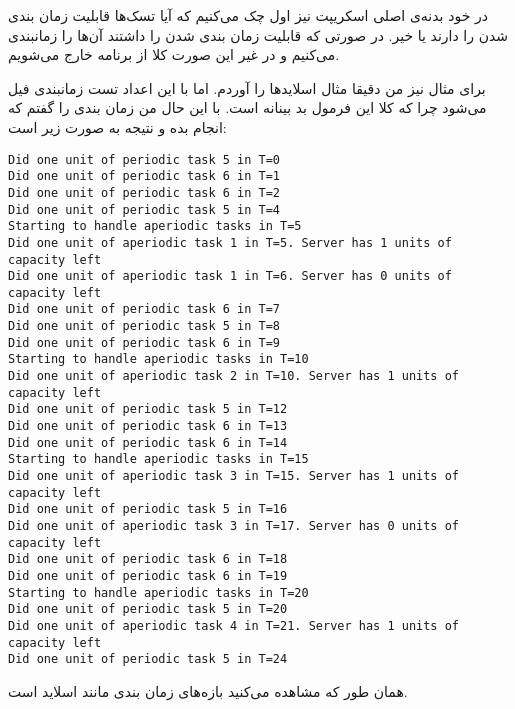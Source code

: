 \documentclass[]{article}
\begin{document}
در خود بدنه‌ی اصلی اسکریپت نیز اول چک می‌کنیم که آیا تسک‌ها قابلیت زمان بندی شدن را دارند یا خیر.
در صورتی که قابلیت زمان بندی شدن را داشتند آن‌ها را زمانبندی می‌کنیم و در غیر این صورت کلا از برنامه
خارج می‌شویم.

برای مثال نیز من دقیقا مثال اسلاید‌ها را آوردم. اما با این اعداد تست زمانبندی فیل می‌شود چرا
که کلا این فرمول بد بینانه است. با این حال من زمان بندی را گفتم که انجام بده و نتیجه به صورت
زیر است:
\begin{latin}
\begin{lstlisting}
Did one unit of periodic task 5 in T=0
Did one unit of periodic task 6 in T=1
Did one unit of periodic task 6 in T=2
Did one unit of periodic task 5 in T=4
Starting to handle aperiodic tasks in T=5
Did one unit of aperiodic task 1 in T=5. Server has 1 units of capacity left
Did one unit of aperiodic task 1 in T=6. Server has 0 units of capacity left
Did one unit of periodic task 6 in T=7
Did one unit of periodic task 5 in T=8
Did one unit of periodic task 6 in T=9
Starting to handle aperiodic tasks in T=10
Did one unit of aperiodic task 2 in T=10. Server has 1 units of capacity left
Did one unit of periodic task 5 in T=12
Did one unit of periodic task 6 in T=13
Did one unit of periodic task 6 in T=14
Starting to handle aperiodic tasks in T=15
Did one unit of aperiodic task 3 in T=15. Server has 1 units of capacity left
Did one unit of periodic task 5 in T=16
Did one unit of aperiodic task 3 in T=17. Server has 0 units of capacity left
Did one unit of periodic task 6 in T=18
Did one unit of periodic task 6 in T=19
Starting to handle aperiodic tasks in T=20
Did one unit of periodic task 5 in T=20
Did one unit of aperiodic task 4 in T=21. Server has 1 units of capacity left
Did one unit of periodic task 5 in T=24
\end{lstlisting}
\end{latin}
همان طور که مشاهده می‌کنید بازه‌های زمان بندی مانند اسلاید است.
\end{document}
